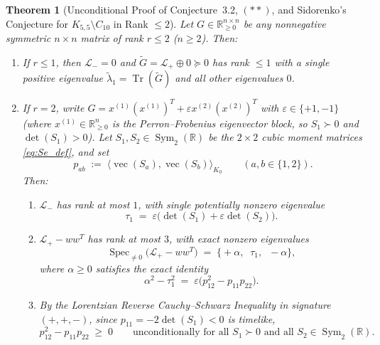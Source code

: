 \documentclass[11pt,a4paper]{article}
\theoremstyle{plain}
\newtheorem{theorem}{Theorem}[section]
\theoremstyle{definition}
\theoremstyle{remark}
\DeclareMathOperator{\Tr}{Tr}
\DeclareMathOperator{\Spec}{Spec}
\DeclareMathOperator{\Sym}{Sym}
\DeclareMathOperator{\vecop}{vec}
\begin{document}
\begin{theorem}[Unconditional Proof of Conjecture~3.2, $(**)$, and Sidorenko's Conjecture for $K_{5,5} \setminus C_{10}$ in Rank $\le 2$]\label{thm:rank2}
Let $G \in \mathbb{R}_{\ge 0}^{n \times n}$ be any nonnegative symmetric $n \times n$ matrix of rank $r \le 2$ ($n \ge 2$). Then:
\begin{enumerate}[label=(\alph*)]
  \item If $r \le 1$, then $\mathcal{L}_- = 0$ and $\widetilde{G} = \mathcal{L}_+ \oplus 0 \succeq 0$ has rank $\le 1$ with a single positive eigenvalue $\widetilde{\lambda}_1 = \Tr(\widetilde{G})$ and all other eigenvalues $0$.
  \item If $r = 2$, write $G = x^{(1)}(x^{(1)})^T + \varepsilon x^{(2)}(x^{(2)})^T$ with $\varepsilon \in \{+1, -1\}$ (where $x^{(1)} \in \mathbb{R}_{\ge 0}^n$ is the Perron--Frobenius eigenvector block, so $S_1 \succ 0$ and $\det(S_1) > 0$). Let $S_1, S_2 \in \Sym_2(\mathbb{R})$ be the $2 \times 2$ cubic moment matrices \eqref{eq:Se_def}, and set
  \[
    p_{ab} \;:=\; \langle \vecop(S_a), \vecop(S_b) \rangle_{K_0} \qquad (a,b \in \{1,2\}).
  \]
  Then:
  \begin{enumerate}[label=(\roman*)]
    \item $\mathcal{L}_-$ has rank at most $1$, with single potentially nonzero eigenvalue
    \begin{equation}\label{eq:tau1_rank2}
      \tau_1 \;=\; \varepsilon\big(\det(S_1) + \varepsilon \det(S_2)\big).
    \end{equation}
    \item $\mathcal{L}_+ - w w^T$ has rank at most $3$, with exact nonzero eigenvalues
    \begin{equation}\label{eq:Ldiff_eigs_rank2}
      \Spec_{\ne 0}\big(\mathcal{L}_+ - w w^T\big) \;=\; \big\{+\alpha, \;\; \tau_1, \;\; -\alpha\big\},
    \end{equation}
    where $\alpha \ge 0$ satisfies the exact identity
    \begin{equation}\label{eq:alpha_tau_gap}
      \boxed{\alpha^2 - \tau_1^2 \;=\; \varepsilon\big(p_{12}^2 - p_{11}p_{22}\big).}
    \end{equation}
    \item By the Lorentzian Reverse Cauchy--Schwarz Inequality in signature $(+,+,-)$, since $p_{11} = -2\det(S_1) < 0$ is timelike,
    \begin{equation}\label{eq:lorentz_rcs}
      p_{12}^2 - p_{11}p_{22} \;\ge\; 0 \qquad \text{unconditionally for all } S_1 \succ 0 \text{ and all } S_2 \in \Sym_2(\mathbb{R}).

\end{equation}
\end{enumerate}
\end{enumerate}
\end{theorem}
\end{document}
